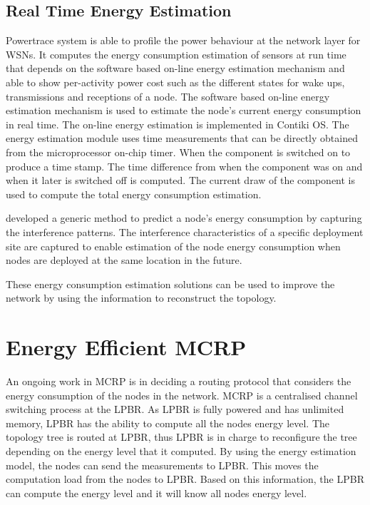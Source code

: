 \subsection{Real Time Energy Estimation}
Powertrace system \cite{dunkels2011powertrace} is able to profile the power behaviour at the network layer for WSNs. It computes the energy consumption estimation of sensors at run time that depends on the software based on-line energy estimation mechanism \cite{dunkels2007software} and able to show per-activity power cost such as the different states for wake ups, transmissions and receptions of a node.
The software based on-line energy estimation mechanism is used to estimate the node's current energy consumption in real time. The on-line energy estimation is implemented in Contiki OS. The energy estimation module uses time measurements that can be directly obtained from the microprocessor on-chip timer. When the component is switched on to produce a time stamp. The time difference from when the component was on and when it later is switched off is computed. The current draw of the component is used to compute the total energy consumption estimation.


\cite{alexlifetime} developed a generic method to predict a node's energy consumption by capturing the interference patterns. The interference characteristics of a specific deployment site are captured to enable estimation of the node energy consumption when nodes are deployed at the same location in the future.

These energy consumption estimation solutions can be used to improve the network by using the information to reconstruct the topology.


\section{Energy Efficient MCRP}
An ongoing work in MCRP is in deciding a routing protocol that considers the energy consumption of the nodes in the network.
MCRP is a centralised channel switching process at the LPBR. As LPBR is fully powered and has unlimited memory, LPBR has the ability to compute all the nodes energy level. The topology tree is routed at LPBR, thus LPBR is in charge to reconfigure the tree depending on the energy level that it computed. By using the energy estimation model, the nodes can send the measurements to LPBR. This moves the computation load from the nodes to LPBR. Based on this information, the LPBR can compute the energy level and it will know all nodes energy level.


